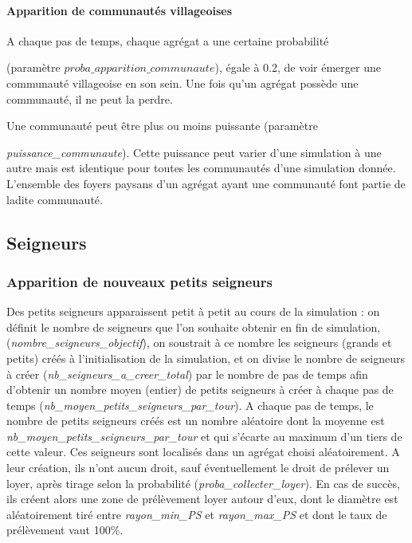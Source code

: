 \documentclass[a4paper,11pt]{article}
\begin{document}
\paragraph{Apparition de communautés villageoises}
A chaque pas de temps, chaque agrégat a une certaine probabilité

(paramètre $proba\_apparition\_communaute$), égale à 0.2, de voir émerger une communauté villageoise en son sein. Une fois qu'un agrégat possède une communauté, il ne peut la perdre.

Une communauté peut être plus ou moins puissante (paramètre {\textit{puissance\_communaute}). Cette puissance peut varier d'une simulation à une autre mais est identique pour toutes les communautés d'une simulation donnée. L'ensemble des foyers paysans d'un agrégat ayant une communauté font partie de ladite communauté.

\subsection{Seigneurs}

\subsubsection{Apparition de nouveaux petits seigneurs}

Des petits seigneurs apparaissent petit à petit au cours de la simulation : on définit le nombre de seigneurs que l'on souhaite obtenir en fin de simulation, (\textit{nombre\_seigneurs\_objectif}), on soustrait à ce nombre les seigneurs (grands et petits) créés à l'initialisation de la simulation, et on divise le nombre de seigneurs à créer (\textit{nb\_seigneurs\_a\_creer\_total}) par le nombre de pas de temps afin d'obtenir un nombre moyen (entier) de petits seigneurs à  créer à chaque pas de temps (\textit{nb\_moyen\_petits\_seigneurs\_par\_tour}).
A chaque pas de temps, le nombre de petits seigneurs créés est un nombre aléatoire dont la moyenne est \textit{nb\_moyen\_petits\_seigneurs\_par\_tour} et qui s'écarte au maximum d'un tiers de cette valeur. Ces seigneurs sont localisés dans un agrégat choisi aléatoirement.
A leur création, ils n'ont aucun droit, sauf éventuellement le droit de prélever un loyer, après tirage selon la probabilité (\textit{proba\_collecter\_loyer}). En cas de succès, ils créent alors une zone de prélèvement loyer autour d'eux, dont le diamètre est aléatoirement tiré entre \textit{rayon\_min\_PS} et \textit{rayon\_max\_PS} et dont le taux de prélèvement vaut 100\%.

}
\end{document}
